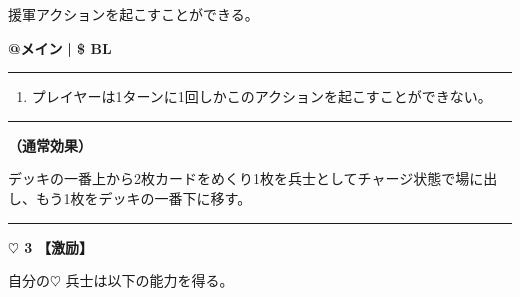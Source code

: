 \documentclass[twocolumn,a5paper,papersize,10pt]{jarticle}
\begin{document}
援軍アクションを起こすことができる。

\begin{tcolorbox}[title={\small\bf【Action】援軍}{\scriptsize （通常魔法）}]

{\scriptsize\bf @メイン }
  {\scriptsize\bf | \$ BL }

\vspace{1mm} %
\hrule height 0.1mm depth 0mm width 62mm %
\vspace{1mm} %


\vspace{-1zh}%
\begin{enumerate}
\renewcommand{\labelenumi}{※}
\setlength{\leftskip}{-0.3cm}
\setlength{\itemsep}{0pt} %
\setlength{\parskip}{0pt} %

\item プレイヤーは1ターンに1回しかこのアクションを起こすことができない。

\vspace{-3mm}%
\end{enumerate}
\vspace{-2mm} %
\vspace{1zh}%
\vspace{1mm} %
\hrule height 0.1mm depth 0mm width 62mm %
\vspace{1mm} %

{\bf（通常効果）}

デッキの一番上から2枚カードをめくり1枚を兵士としてチャージ状態で場に出し、もう1枚をデッキの一番下に移す。

\vspace{1mm} %
\end{tcolorbox}

\vspace{-1zh}
  
 

\vspace{3mm} %
\hrule height 0.5mm depth 0mm width 66.5mm %
\vspace{1mm} %
{\Large\bf $\heartsuit$ 3} {\normalsize\bf【激励】} %
\vspace{1mm} %

自分の{\normalsize $\heartsuit$} 兵士は以下の能力を得る。
\end{document}
